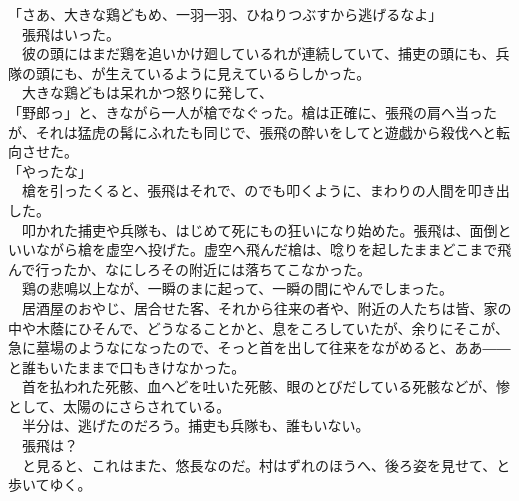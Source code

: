 \documentclass[
  paper=a5,
  fontsize=10pt,
  jafontsize=9.5pt,
  tate,                  %
  open_bracket_pos=nibu, %
]{jlreq}
\begin{document}
「さあ、大きな鶏どもめ、一羽一羽、ひねりつぶすから逃げるなよ」\\


　張飛はいった。\\


　彼の頭にはまだ鶏を追いかけ廻しているれが連続していて、捕吏の頭にも、兵隊の頭にも、が生えているように見えているらしかった。\\


　大きな鶏どもは呆れかつ怒りに発して、\\


「野郎っ」と、きながら一人が槍でなぐった。槍は正確に、張飛の肩へ当ったが、それは猛虎の髯にふれたも同じで、張飛の酔いをしてと遊戯から殺伐へと転向させた。\\


「やったな」\\


　槍を引ったくると、張飛はそれで、のでも叩くように、まわりの人間を叩き出した。\\


　叩かれた捕吏や兵隊も、はじめて死にもの狂いになり始めた。張飛は、面倒といいながら槍を虚空へ投げた。虚空へ飛んだ槍は、唸りを起したままどこまで飛んで行ったか、なにしろその附近には落ちてこなかった。\\


　鶏の悲鳴以上なが、一瞬のまに起って、一瞬の間にやんでしまった。\\


　居酒屋のおやじ、居合せた客、それから往来の者や、附近の人たちは皆、家の中や木蔭にひそんで、どうなることかと、息をころしていたが、余りにそこが、急に墓場のようなになったので、そっと首を出して往来をながめると、ああ――と誰もいたままで口もきけなかった。\\


　首を払われた死骸、血へどを吐いた死骸、眼のとびだしている死骸などが、惨として、太陽のにさらされている。\\


　半分は、逃げたのだろう。捕吏も兵隊も、誰もいない。\\


　張飛は？\\


　と見ると、これはまた、悠長なのだ。村はずれのほうへ、後ろ姿を見せて、と歩いてゆく。\\
\end{document}
